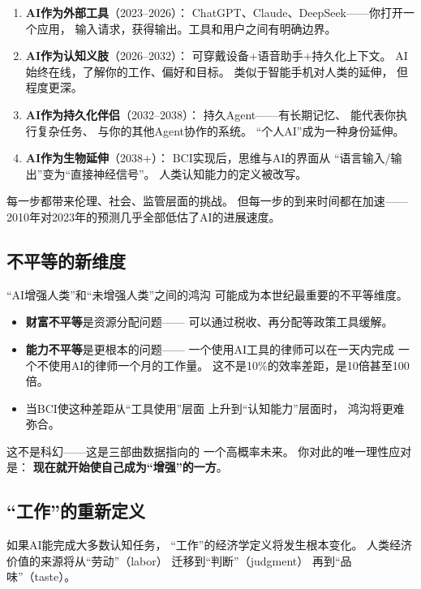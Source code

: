 \begin{enumerate}
  \item \textbf{AI作为外部工具}（2023--2026）：
    ChatGPT、Claude、DeepSeek——你打开一个应用，
    输入请求，获得输出。工具和用户之间有明确边界。
  \item \textbf{AI作为认知义肢}（2026--2032）：
    可穿戴设备+语音助手+持久化上下文。
    AI始终在线，了解你的工作、偏好和目标。
    类似于智能手机对人类的延伸，
    但程度更深。
  \item \textbf{AI作为持久化伴侣}（2032--2038）：
    持久Agent——有长期记忆、
    能代表你执行复杂任务、
    与你的其他Agent协作的系统。
    ``个人AI''成为一种身份延伸。
  \item \textbf{AI作为生物延伸}（2038+）：
    BCI实现后，思维与AI的界面从
    ``语言输入/输出''变为``直接神经信号''。
    人类认知能力的定义被改写。
\end{enumerate}

每一步都带来伦理、社会、监管层面的挑战。
但每一步的到来时间都在加速——
2010年对2023年的预测几乎全部低估了AI的进展速度。

\subsection{不平等的新维度}

\begin{warnbox}[21世纪最危险的不平等]
``AI增强人类''和``未增强人类''之间的鸿沟
可能成为本世纪最重要的不平等维度。
\begin{itemize}
  \item \textbf{财富不平等}是资源分配问题——
    可以通过税收、再分配等政策工具缓解。
  \item \textbf{能力不平等}是更根本的问题——
    一个使用AI工具的律师可以在一天内完成
    一个不使用AI的律师一个月的工作量。
    这不是10\%的效率差距，是10倍甚至100倍。
  \item 当BCI使这种差距从``工具使用''层面
    上升到``认知能力''层面时，
    鸿沟将更难弥合。
\end{itemize}
这不是科幻——这是三部曲数据指向的
一个高概率未来。
你对此的唯一理性应对是：
\textbf{现在就开始使自己成为``增强''的一方}。
\end{warnbox}

\subsection{``工作''的重新定义}

如果AI能完成大多数认知任务，
``工作''的经济学定义将发生根本变化。
人类经济价值的来源将从``劳动''（labor）
迁移到``判断''（judgment）
再到``品味''（taste）。

